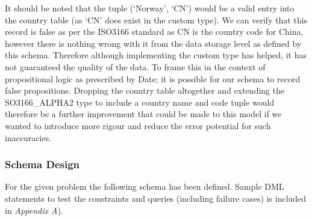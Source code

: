\documentclass[12pt]{article}
\begin{document}
It should be noted that the tuple (`Norway', `CN') would be a valid entry into the country table (as `CN' does exist in the custom type). We can verify that this record is false as per the ISO3166 standard as CN is the country code for China, however there is nothing wrong with it from the data storage level as defined by this schema. Therefore although implementing the custom type has helped, it has not guaranteed the quality of the data. To frame this in the context of propositional logic as prescribed by Date; it is possible for our schema to record false propositions. Dropping the country table altogether and extending the SO3166\_ALPHA2 type to include a country name and code tuple would therefore be a further improvement that could be made to this model if we wanted to introduce more rigour and reduce the error potential for such inaccuracies.

\subsubsection{Schema Design}
For the given problem the following schema has been defined. Sample DML statements to test the constraints and queries (including failure cases) is included in \emph{Appendix A}).
\end{document}
